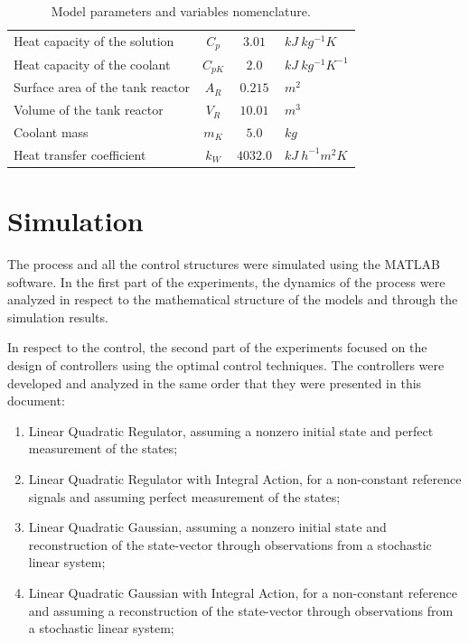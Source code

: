 \documentclass[a4paper,11pt]{book}
\numberwithin{figure}{chapter}
\numberwithin{equation}{chapter}
\numberwithin{table}{chapter}
\theoremstyle{definition}
\begin{document}
\begin{table}[ht]
\begin{tabular}{l | c | c l }
	Heat capacity of the solution & $C_p$ & $3.01$ & $kJ\ kg^{-1} K$ \\
	Heat capacity of the coolant & $C_{pK}$ & $2.0$ & $kJ\ kg^{-1} K^{-1}$ \\
	Surface area of the tank reactor & $A_R$ & $0.215$ & $m^2$ \\
	Volume of the tank reactor & $V_R$ & $10.01$ & $m^3$ \\
	Coolant mass & $m_K$ & $5.0$ & $kg$ \\
	Heat transfer coefficient & $k_W$ & $4032.0$ & $kJ\ h^{-1} m^2 K$ \\
  \end{tabular} 
  \caption{Model parameters and variables nomenclature.}
  \label{table:exo_parameters} 
\end{table} \vskip0.25cm


\section{Simulation}

The process and all the control structures were simulated using the MATLAB software. In the first part of the experiments, the dynamics of the process were analyzed in respect to the mathematical structure of the models and through the simulation results. 

In respect to the control, the second part of the experiments focused on the design of controllers using the optimal control techniques. The controllers were developed and analyzed in the same order that they were presented in this document:
\begin{enumerate}
	\item Linear Quadratic Regulator, assuming a nonzero initial state and perfect measurement of the states;
	\item Linear Quadratic Regulator with Integral Action, for a non-constant reference signals and assuming perfect measurement of the states;
	\item Linear Quadratic Gaussian, assuming a nonzero initial state and reconstruction of the state-vector through observations from a stochastic linear system;
	\item Linear Quadratic Gaussian with Integral Action, for a non-constant reference and assuming a reconstruction of the state-vector through observations from a stochastic linear system;
\end{enumerate}
\end{document}
